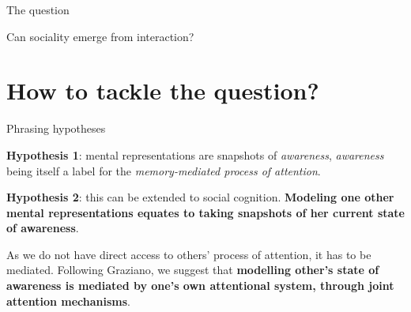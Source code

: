 \documentclass[compress]{beamer}
\begin{document}
\begin{frame}{The question}

    \Large
    \centering

    Can sociality emerge from interaction?

\end{frame}

\section{How to tackle the question?}

\begin{frame}{Phrasing hypotheses}

    {\bf Hypothesis 1}: mental representations are snapshots of
    \emph{awareness}, \emph{awareness} being itself a label for the
    \emph{memory-mediated process of attention}.

    \pause

    {\bf Hypothesis 2}: this can be extended to social cognition. \textbf{Modeling one
    other mental representations equates to taking snapshots of her current
    state of awareness}.

    As we do not have direct access to others' process of attention, it has to
    be mediated. Following Graziano, we suggest that \textbf{modelling other's
    state of awareness is mediated by one's own attentional system, through
    joint attention mechanisms}.

\end{frame}
\end{document}
